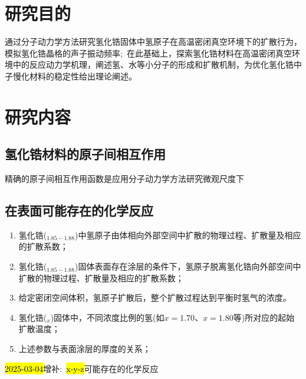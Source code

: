 \section{研究目的} 
通过分子动力学方法研究氢化锆固体中氢原子在高温密闭真空环境下的扩散行为，模拟氢化锆晶格的声子振动频率;~在此基础上，探索氢化锆材料在高温密闭真空环境中的反应动力学机理，阐述氢、水等小分子的形成和扩散机制，为优化氢化锆中子慢化材料的稳定性给出理论阐述。

\section{研究内容}
\subsection{氢化锆材料的原子间相互作用}
精确的原子间相互作用函数是应用分子动力学方法研究微观尺度下
\subsection{在表面可能存在的化学反应}

\begin{enumerate}
	\item 氢化锆($_{1.85-1.88}$)中氢原子由体相向外部空间中扩散的物理过程、扩散量及相应的扩散系数；

	\item 氢化锆($_{1.85-1.88}$)固体表面存在涂层的条件下，氢原子脱离氢化锆向外部空间中扩散的物理过程、扩散量及相应的扩散系数；

	\item 给定密闭空间体积，氢原子扩散后，整个扩散过程达到平衡时氢气的浓度。

	\item 氢化锆($_x$)固体中，不同浓度比例的氢(如$x=1.70$、$x=1.80$等)所对应的起始扩散温度；

	\item 上述参数与表面涂层的厚度的关系；
\end{enumerate}

\textcolor{red}{\hl{2025-03-04}}增补:~\hl{x-y-z}可能存在的化学反应

